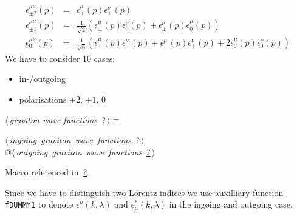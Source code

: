 \documentclass[a4paper,12pt]{amsart}
\renewcommand{\NWtarget}[2]{\hypertarget{#1}{#2}}
\renewcommand{\NWlink}[2]{\hyperlink{#1}{#2}}
\renewcommand{\NWtxtMacroRefIn}{Macro referenced in}
\renewcommand{\NWsep}{${\diamond}$}
\begin{document}
\begin{flushleft}
\begin{minipage}{\linewidth}
\begin{list}{}{\setlength{\itemsep}{-\parsep}\setlength{\itemindent}{-\leftmargin}}
\item{}
\end{list}
\end{minipage}\vspace{4ex}
\end{flushleft}
\begin{eqnarray}
\epsilon^{\mu\nu}_{\pm2}(p) &=& \epsilon_\pm^\mu(p)\epsilon_\pm^\nu(p)\\
\epsilon^{\mu\nu}_{\pm1}(p) &=& \frac1{\sqrt2}\left(
	\epsilon_\pm^\mu(p)\epsilon_0^\nu(p)
       +\epsilon_\pm^\nu(p)\epsilon_0^\mu(p)\right)\\
\epsilon^{\mu\nu}_0(p) &=&\frac1{\sqrt6}\left(
        \epsilon_+^\mu(p)\epsilon_-^\nu(p)
       +\epsilon_-^\mu(p)\epsilon_+^\nu(p)
       +2\epsilon_0^\mu(p)\epsilon_0^\nu(p)\right)
\end{eqnarray}
We have to consider 10 cases:
\begin{itemize}
\item in-/outgoing
\item polarisations $\pm2$, $\pm1$, $0$
\end{itemize}

\begin{flushleft} \small
\begin{minipage}{\linewidth}\label{scrap39}\raggedright\small
\NWtarget{nuweb?}{} $\langle\,${\it graviton wave functions}\nobreak\ {\footnotesize {?}}$\,\rangle\equiv$
\vspace{-1ex}
\begin{list}{}{} \item
\mbox{}\verb@@\hbox{$\langle\,${\it ingoing graviton wave functions}\nobreak\ {\footnotesize \NWlink{nuweb?}{?}}$\,\rangle$}\verb@@\\
\mbox{}\verb@   @\hbox{$\langle\,${\it outgoing graviton wave functions}\nobreak\ {\footnotesize \NWlink{nuweb?}{?}}$\,\rangle$}\verb@@{\NWsep}
\end{list}
\vspace{-1.5ex}
\footnotesize
\begin{list}{}{\setlength{\itemsep}{-\parsep}\setlength{\itemindent}{-\leftmargin}}
\item \NWtxtMacroRefIn\ \NWlink{nuweb?}{?}.

\item{}
\end{list}
\end{minipage}\vspace{4ex}
\end{flushleft}
Since we have to distinguish two Lorentz indices we use
auxilliary function \texttt{fDUMMY1}
to denote $\epsilon^\mu(k,\lambda)$ and $\epsilon^\ast_\mu(k,\lambda)$
in the ingoing and outgoing case.
\end{document}
